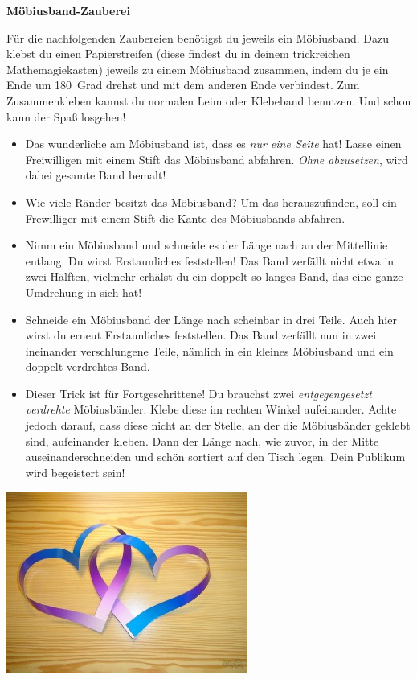 \documentclass[a5paper,ngerman,12pt]{scrartcl}
\begin{document}
\begin{center}
  \Huge\bf\sffamily
  Möbiusband-Zauberei
\end{center}

\renewcommand{\labelitemi}{$\infty$}

Für die nachfolgenden Zaubereien benötigst du jeweils ein
Möbiusband. Dazu klebst du einen Papierstreifen (diese findest du
in deinem trickreichen Mathemagiekasten) jeweils zu einem Möbiusband
zusammen, indem du je ein Ende um 180~Grad drehst und mit dem anderen Ende
verbindest. Zum Zusammenkleben kannst du normalen Leim oder Klebeband
benutzen. Und schon kann der Spaß losgehen!

\begin{itemize}
\item Das wunderliche am Möbiusband ist, dass es \emph{nur eine Seite} hat!
Lasse einen Freiwilligen mit einem Stift das Möbiusband abfahren. \emph{Ohne
abzusetzen}, wird dabei gesamte Band bemalt!

\item Wie viele Ränder besitzt das Möbiusband? Um das herauszufinden, soll ein
Frewilliger mit einem Stift die Kante des Möbiusbands abfahren.

\item Nimm ein Möbiusband und schneide es der Länge nach an der
Mittellinie entlang. Du wirst Erstaunliches feststellen! Das Band zerfällt
nicht etwa in zwei Hälften, vielmehr erhälst du ein doppelt so langes Band,
das eine ganze Umdrehung in sich hat!

\item Schneide ein Möbiusband der Länge nach scheinbar in drei
Teile. Auch hier wirst du erneut Erstaunliches feststellen. Das Band
zerfällt nun in zwei ineinander verschlungene Teile, nämlich in
ein kleines Möbiusband und ein doppelt verdrehtes Band.

\item Dieser Trick ist für Fortgeschrittene!
Du brauchst zwei \emph{entgegengesetzt verdrehte} Möbiusbänder. Klebe diese im
rechten Winkel aufeinander. Achte jedoch darauf, dass diese nicht an
der Stelle, an der die Möbiusbänder geklebt sind, aufeinander kleben. Dann
der Länge nach, wie zuvor, in der Mitte auseinanderschneiden und schön sortiert auf den
Tisch legen. Dein Publikum wird begeistert sein!
\end{itemize}

\begin{center}
  \includegraphics[scale=0.5]{herzen}
\end{center}
\end{document}
